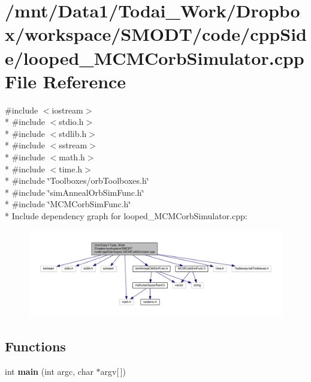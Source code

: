 \section{/mnt/\-Data1/\-Todai\-\_\-\-Work/\-Dropbox/workspace/\-S\-M\-O\-D\-T/code/cpp\-Side/looped\-\_\-\-M\-C\-M\-Corb\-Simulator.cpp File Reference}
\label{looped___m_c_m_corb_simulator_8cpp}
{\ttfamily \#include $<$iostream$>$}\\*
{\ttfamily \#include $<$stdio.\-h$>$}\\*
{\ttfamily \#include $<$stdlib.\-h$>$}\\*
{\ttfamily \#include $<$sstream$>$}\\*
{\ttfamily \#include $<$math.\-h$>$}\\*
{\ttfamily \#include $<$time.\-h$>$}\\*
{\ttfamily \#include \char`\"{}Toolboxes/orb\-Toolboxes.\-h\char`\"{}}\\*
{\ttfamily \#include \char`\"{}sim\-Anneal\-Orb\-Sim\-Func.\-h\char`\"{}}\\*
{\ttfamily \#include \char`\"{}M\-C\-M\-Corb\-Sim\-Func.\-h\char`\"{}}\\*
Include dependency graph for looped\-\_\-\-M\-C\-M\-Corb\-Simulator.\-cpp\-:\nopagebreak
\begin{figure}[H]
\begin{center}
\leavevmode
\includegraphics[width=350pt]{looped___m_c_m_corb_simulator_8cpp__incl}
\end{center}
\end{figure}
\subsection*{Functions}
\begin{DoxyCompactItemize}
\item 
int {\bf main} (int argc, char $\ast$argv[$\,$])
\end{DoxyCompactItemize}



